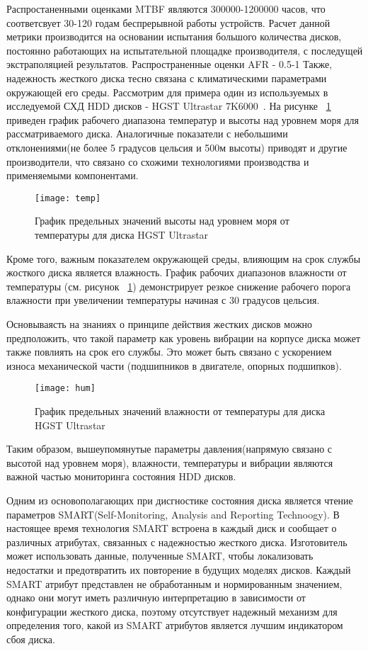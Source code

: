 Распростаненными оценками MTBF являются 300000-1200000 часов, что соответсвует 30-120 годам беспрерывной работы устройств. Расчет данной метрики производится на основании испытания большого количества дисков, постоянно работающих на испытательной площадке производителя, с последущей экстраполяцией результатов. 
Распространенные оценки AFR - 0.5-1%
Также, надежность жесткого диска тесно связана с климатическими параметрами окружающей его среды. 
Рассмотрим для примера один из используемых в исследуемой СХД HDD дисков - HGST Ultrastar 7K6000~\cite{HGST}. На рисунке ~\ref{fig:temp} приведен график рабочего диапазона температур и высоты над уровнем моря для рассматриваемого диска. Аналогичные показатели с небольшими отклонениями(не более 5 градусов цельсия и 500м высоты) приводят и другие производители, что связано со схожими технологиями производства и применяемыми компонентами. 

\begin{figure}[!h]
	\centering
	\texttt{[image: temp]}
	\caption{График предельных значений высоты над уровнем моря от температуры для диска HGST Ultrastar}
	\label{fig:temp}
\end{figure}

Кроме того, важным показателем окружающей среды, влияющим на срок службы жосткого диска является влажность. График рабочих диапазонов влажности от температуры (см. рисунок ~\ref{fig:temp}) демонстрирует резкое снижение рабочего порога влажности при увеличении температуры начиная с 30 градусов цельсия. 

Основываясть на знаниях о принципе действия жестких дисков можно предположить, что такой параметр как уровень вибрации на корпусе диска может также повлиять на срок его службы. Это может быть связано с ускорением износа механической части (подшипников в двигателе, опорных подшипков).

\begin{figure}[!h]
	\centering
	\texttt{[image: hum]}
	\caption{График предельных значений влажности от температуры для диска HGST Ultrastar}
	\label{fig:hum}
\end{figure}

Таким образом, вышеупомянутые параметры давления(напрямую связано с высотой над уровнем моря), влажности, температуры и вибрации являются важной частью мониторинга состояния HDD дисков. 

Одним из основополагающих при дисгностике состояния диска является чтение параметров SMART(Self-Monitoring, Analysis and Reporting Technoogy). В настоящее время 
технология  SMART  встроена  в  каждый  диск  и  сообщает  о  различных 
атрибутах,  связанных  с  надежностью  жесткого  диска. Изготовитель  может 
использовать данные, полученные SMART, чтобы локализовать недостатки и 
предотвратить их повторение в будущих моделях дисков. Каждый SMART 
атрибут   представлен   не обработанным и нормированным значением, однако они могут иметь различную интерпретацию в зависимости 
от конфигурации жесткого диска, поэтому отсутствует надежный механизм 
для  определения  того,  какой  из  SMART  атрибутов  является  лучшим 
индикатором сбоя диска. 

